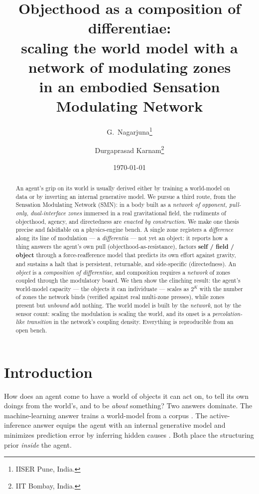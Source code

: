 \documentclass[11pt]{article}
\title{\textbf{Objecthood as a composition of differentiae:\\ scaling the world model with a network of modulating zones\\ in an embodied Sensation Modulating Network}}
\author{G.\ Nagarjuna\thanks{IISER Pune, India.} \and Durgaprasad Karnam\thanks{IIT Bombay, India.}}
\date{\today}
\begin{document}
\maketitle

\begin{abstract}
\noindent
An agent's grip on its world is usually derived either by training a world-model
on data or by inverting an internal generative model. We pursue a third route,
from the Sensation Modulating Network (SMN): in a body built as a \emph{network
of opponent, pull-only, dual-interface zones} immersed in a real gravitational
field, the rudiments of objecthood, agency, and directedness are \emph{enacted by
construction}. We make one thesis precise and falsifiable on a physics-engine
bench. A single zone registers a \emph{difference} along its line of modulation
--- a \emph{differentia} --- not yet an object: it reports how a thing answers the
agent's own pull (objecthood-as-resistance), factors \textbf{self / field /
object} through a force-reafference model that predicts its own effort against
gravity, and sustains a halt that is persistent, returnable, and side-specific
(directedness). An \emph{object} is a \emph{composition of differentiae}, and
composition requires a \emph{network} of zones coupled through the modulatory
board. We then show the clinching result: the agent's world-model capacity ---
the objects it can individuate --- scales as $2^{K}$ with the number of zones the
network binds (verified against real multi-zone presses), while zones present but
\emph{unbound} add nothing. The world model is built by the \emph{network}, not by
the sensor count: scaling the modulation is scaling the world, and its onset is a
\emph{percolation-like transition} in the network's coupling density. Everything
is reproducible from an open bench.
\end{abstract}

\section{Introduction}

How does an agent come to have a world of objects it can act on, to tell its own
doings from the world's, and to be \emph{about} something? Two answers dominate.
The machine-learning answer trains a world-model from a corpus
\citep{Chen2018NeuralODE}. The active-inference answer equips the agent with an
internal generative model and minimizes prediction error by inferring hidden
causes \citep{ParrPezzuloFriston2022}. Both place the structuring prior
\emph{inside} the agent.
\end{document}
